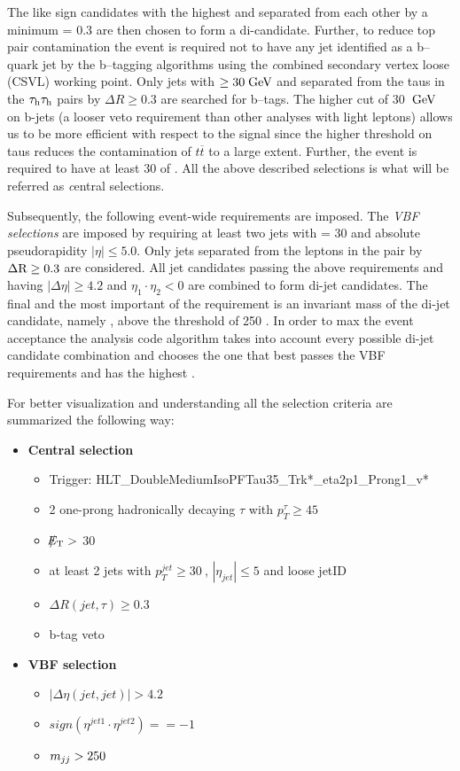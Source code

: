 The like sign \hadtau candidates with the highest \pt and separated from each other by a minimum \deltar = 0.3 are then chosen to form a di-\hadtau candidate. 
Further, to reduce top pair contamination the event is required not to have any jet identified as a b--quark jet by the b--tagging algorithms using the {\textit combined secondary vertex loose} (CSVL) working point. Only jets with \pt $\ge 30 \;\text{Ge}\kern-0.06667em\text{V}$ and separated from the taus in the $\tau_{\text{h}}\tau_{\text{h}}$ pairs by $\Delta R \ge 0.3$ are searched for b--tags. The higher \pt cut of 30 $\;\text{Ge}\kern-0.06667em\text{V}$ on b-jets (a looser veto requirement than other analyses with light leptons) allows us to be more efficient with respect to the signal since the higher \pt threshold on taus reduces the contamination of $t\overline{t}$ to a large extent. Further, the event is required to have at least 30 \gev of \met. All the above described selections is what will be referred as {\textit central selections}.

Subsequently, the following event-wide requirements are imposed. The {\textit {VBF selections}} are imposed by requiring at least two jets with \pt = 30 \gev and absolute pseudorapidity $|\eta| \le 5.0$. Only jets separated from the leptons in the \hadtau\hadtau pair by $\Delta \text{R} \ge 0.3$ are considered. All jet candidates passing the above requirements and having $\vert \Delta\eta \vert \ge 4.2$ and $\eta_{1}\cdot\eta_{2} < 0$ are combined to form di-jet candidates. The final and the most important of the requirement is an invariant mass of the di-jet candidate, namely \mjj, above the threshold of 250 \gev. In order to max the event acceptance the analysis code algorithm takes into account every possible di-jet candidate combination and chooses the one that best passes the VBF requirements and has the highest \mjj. 

For better visualization and understanding all the selection criteria are summarized the following way:

\begin{itemize}
	\item \textbf{Central selection}
	\begin{itemize}
		\item Trigger: HLT\_DoubleMediumIsoPFTau35\_Trk*\_eta2p1\_Prong1\_v*
		\item 2 one-prong hadronically decaying $\tau$ with $p_{T}^{\tau}\geq45~$\gev 
		\item $\slash\mkern-12mu{E}_{\text{T}} > $ 30
		\item at least 2 jets with $p_{T}^{jet}\geq30~$\gev, $|\eta_{jet}|\leq5$ and loose jetID
		\item $\Delta R(jet,\tau)\geq0.3$
		\item b-tag veto
	\end{itemize}
	\item \textbf{VBF selection}
	\begin{itemize}
		\item $|\Delta\eta(jet,jet)| > 4.2$
		\item $sign(\eta^{jet 1}\cdot\eta^{jet 2})==-1$
		\item $m_{jj}>250~$\gev
	\end{itemize}
\end{itemize}

